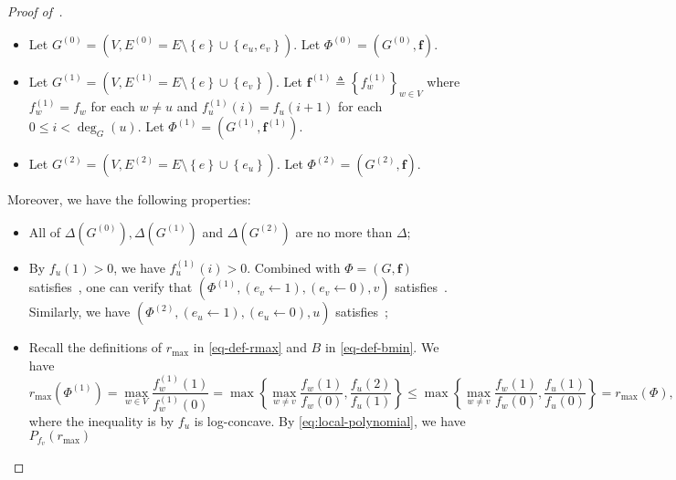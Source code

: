 \documentclass[11pt]{article}
\newcommand{\set}[1]{\left\{#1\right\}}
\newcommand{\vecf}{\boldsymbol{f}}
\begin{document}
\begin{proof}[Proof of~]
    \begin{itemize}
    \item Let $G^{(0)} = \left(V, E^{(0)} = E \setminus \set{e} \cup \set{e_u, e_v}\right)$. Let $\Phi^{(0)} = \left(G^{(0)}, \vecf\right)$.
    \item Let $G^{(1)} = \left(V, E^{(1)} = E \setminus \set{e} \cup \set{e_v}\right)$. Let $\vecf^{(1)} \triangleq \set{f_w^{(1)}}_{w \in V}$ where $f_w^{(1)} = f_w$ for each $w \neq u$ and $f_u^{(1)}(i) = f_u(i + 1)$ for each $0 \le i < \deg_G(u)$. Let $\Phi^{(1)} = \left(G^{(1)}, \vecf^{(1)}\right)$.
    \item Let $G^{(2)} = \left(V, E^{(2)} = E \setminus \set{e} \cup \set{e_u}\right)$. Let $\Phi^{(2)} = \left(G^{(2)}, \vecf\right)$.
    \end{itemize}
    Moreover, we have the following properties:
    \begin{itemize}
    \item All of $\Delta\left(G^{(0)}\right), \Delta\left(G^{(1)}\right)$ and $\Delta\left(G^{(2)}\right)$ are no more than $\Delta$;
    \item By $f_u(1)>0$, we have $f_u^{(1)}(i) >0$. Combined with  $\Phi = (G,\vecf)$ satisfies~, one can verify that $\left(\Phi^{(1)},(e_v\leftarrow 1),(e_v\leftarrow 0),v\right)$ satisfies~.
    Similarly, we have $\left(\Phi^{(2)},(e_u\leftarrow 1),(e_u\leftarrow 0),u\right)$ satisfies~;
    \item Recall the definitions of $r_{\max}$ in \eqref{eq-def-rmax} and $B$ in \eqref{eq-def-bmin}. We have 
    \[r_{\max}(\Phi^{(1)}) = \max_{w \in V} \frac{f^{(1)}_w(1)}{f^{(1)}_w(0)} = \max\left\{\max_{w\neq v} \frac{f_w(1)}{f_w(0)},\frac{f_u(2)}{f_u(1)}\right\} \leq \max\left\{\max_{w\neq v} \frac{f_w(1)}{f_w(0)},\frac{f_u(1)}{f_u(0)}\right\} = r_{\max}(\Phi),\]
    where the inequality is by $f_u$ is log-concave.
    By \eqref{eq:local-polynomial}, we have 
    $P_{f_v}(r_{\max})$


\end{itemize}
\end{proof}
\end{document}
